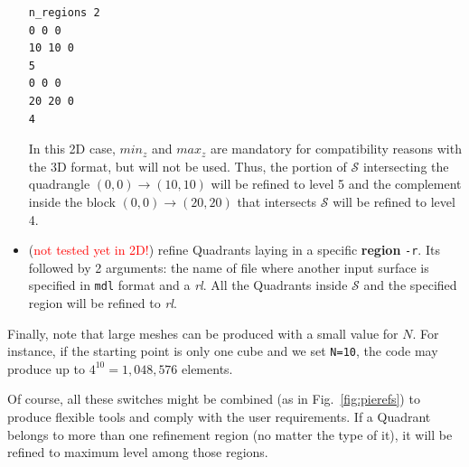 \documentclass[10pt]{article}
\begin{document}
\begin{itemize}
%
\begin{minipage}{0.2\textwidth}
\begin{tcolorbox}
\begin{verbatim}
n_regions 2
0 0 0
10 10 0
5
0 0 0
20 20 0
4
\end{verbatim}
\end{tcolorbox}
\end{minipage}
\hfill
\begin{minipage}[c]{0.65\textwidth}
In this 2D case, $min_z$ and $max_z$ are mandatory for compatibility reasons with the 3D format, but will not be used. Thus, the portion of $\mathcal{S}$ intersecting the quadrangle $(0,0) \to (10,10)$ will be refined to level 5 and the complement inside the block $(0,0) \to (20,20)$ that intersects $\mathcal{S}$ will be refined to level 4.\\[0.2cm]
\end{minipage}
\item (\textcolor{red}{not tested yet in 2D!}) refine Quadrants laying in a specific \textbf{region} \texttt{-r}. Its followed by 2 arguments: the name of file where another input surface is specified in \texttt{mdl} format and a \textit{rl}. All the Quadrants inside $\mathcal{S}$ and the specified region will be refined to \textit{rl}. %
\end{itemize}

Finally, note that large meshes can be produced with a small value for $N$. For instance, if the starting point is only one cube and we set \texttt{N=10}, the code may produce up to $4^{10} = 1,048,576$ elements.

Of course, all these switches might be combined (as in Fig.~\ref{fig:pierefs}) to produce flexible tools and comply with the user requirements. If a Quadrant belongs to more than one refinement region (no matter the type of it), it will be refined to maximum level among those regions.\\
\end{document}
